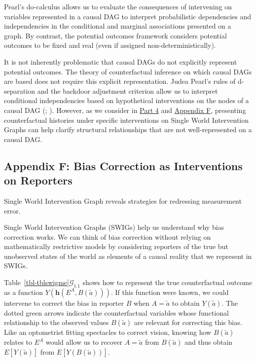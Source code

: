 \documentclass[
  single column]{article}
\begin{document}
Pearl's do-calculus allows us to evaluate the consequences of
intervening on variables represented in a causal DAG to interpret
probabilistic dependencies and independencies in the conditional and
marginal associations presented on a graph. By contrast, the potential
outcomes framework considers potential outcomes to be fixed and real
(even if assigned non-deterministically).

It is not inherently problematic that causal DAGs do not explicitly
represent potential outcomes. The theory of counterfactual inference on
which causal DAGs are based does not require this explicit
representation. Judea Pearl's rules of d-separation and the backdoor
adjustment criterion allow us to interpret conditional independencies
based on hypothetical interventions on the nodes of a causal DAG
(;
). However, as we consider in
\hyperref[id-sec-4]{Part 4} and \hyperref[id-app-f]{Appendix F},
presenting counterfactual histories under specific interventions on
Single World Intervention Graphs can help clarify structural
relationships that are not well-represented on a causal DAG.

\newpage{}

\subsection{Appendix F: Bias Correction as Interventions on
Reporters}\label{id-app-F}

\begin{table}

\caption{\label{tbl-tblswigme}Single World Intervention Graph reveals
strategies for redressing measurement error.}

\centering{

\tblswigme

}

\end{table}%

Single World Intervention Graphs (SWIGs) help us understand why bias
correction works. We can think of bias correction without relying on
mathematically restrictive models by considering reporters of the true
but unobserved states of the world as elements of a causal reality that
we represent in SWIGs.

Table~\ref{tbl-tblswigme}\(\mathcal{G}_{1.1}\) shows how to represent
the true counterfactual outcome as a function
\(Y(\mathbf{h}(E^A, B(\tilde{a})))\). If this function were known, we
could intervene to correct the bias in reporter \(B\) when
\(A = \tilde{a}\) to obtain \(Y(\tilde{a})\). The dotted green arrows
indicate the counterfactual variables whose functional relationship to
the observed values \(B(\tilde{a})\) are relevant for correcting this
bias. Like an optometrist fitting spectacles to correct vision, knowing
how \(B(\tilde{a})\) relates to \(E^A\) would allow us to recover
\(A = \tilde{a}\) from \(B(\tilde{a})\) and thus obtain
\(E[Y(\tilde{a})]\) from \(E[Y(B(\tilde{a}))]\).
\end{document}
